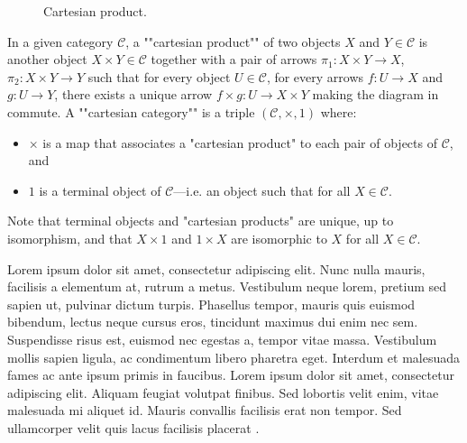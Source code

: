 \documentclass{fancy-article}
\begin{document}
\begin{figure}
  \begin{center}
  \caption{\label{fig:cartesian_product}
    Cartesian product.}
  \end{center}
\end{figure}
\AP In a given category $\mathcal{C}$, a ""cartesian product""
of two objects $X$ and $Y \in \mathcal{C}$ is
another object $X\times Y \in \mathcal{C}$ together with a pair of arrows
$\pi_1: X\times Y \to X$, $\pi_2: X\times Y \to Y$ such that for every
object $U\in\mathcal{C}$, for every arrows $f: U \to X$ and $g: U \to Y$,
there exists a unique arrow $f\times g : U \to X\times Y$ making the
diagram in  commute.
A ""cartesian category"" is a triple $(\mathcal{C}, \times, 1)$
where:
\begin{itemize}
  \item $\times$ is a map that associates a "cartesian product" to
  each pair of objects of $\mathcal{C}$, and
  \item $1$ is a terminal object of $\mathcal{C}$---i.e. an object such that
  for all $X\in \mathcal{C}$.
\end{itemize}
Note that terminal objects and "cartesian products" are unique, up to
isomorphism, and that $X \times 1$ and $1\times X$ are isomorphic to $X$
for all $X \in \mathcal{C}$.


\AP Lorem ipsum dolor sit amet, consectetur adipiscing elit. Nunc nulla mauris, facilisis a elementum at, rutrum a metus. Vestibulum neque lorem, pretium sed sapien ut, pulvinar dictum turpis. Phasellus tempor, mauris quis euismod bibendum, lectus neque cursus eros, tincidunt maximus dui enim nec sem. Suspendisse risus est, euismod nec egestas a, tempor vitae massa. Vestibulum mollis sapien ligula, ac condimentum libero pharetra eget. Interdum et malesuada fames ac ante ipsum primis in faucibus. Lorem ipsum dolor sit amet, consectetur adipiscing elit. Aliquam feugiat volutpat finibus. Sed lobortis velit enim, vitae malesuada mi aliquet id. Mauris convallis facilisis erat non tempor. Sed ullamcorper velit quis lacus facilisis placerat \cite{rosenstein1982linear}.
\end{document}
